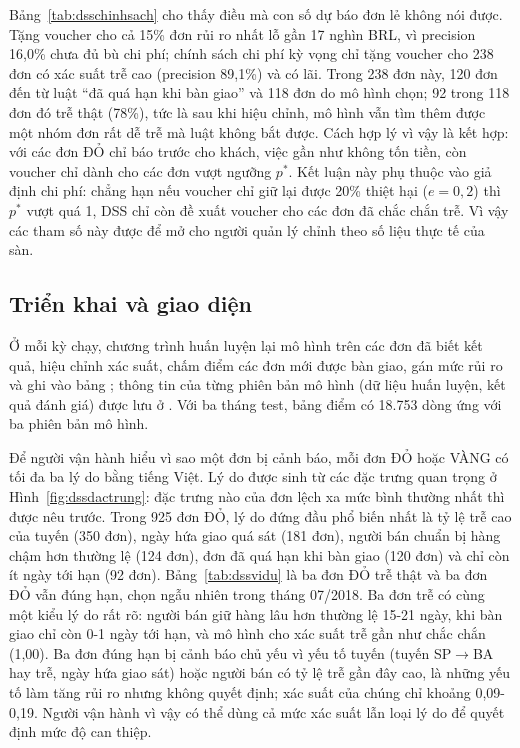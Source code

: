 Bảng~\ref{tab:dsschinhsach} cho thấy điều mà con số dự báo đơn lẻ không nói được. Tặng voucher cho cả 15\% đơn rủi ro nhất lỗ gần 17 nghìn BRL, vì precision 16,0\% chưa đủ bù chi phí; chính sách chi phí kỳ vọng chỉ tặng voucher cho 238 đơn có xác suất trễ cao (precision 89,1\%) và có lãi. Trong 238 đơn này, 120 đơn đến từ luật ``đã quá hạn khi bàn giao'' và 118 đơn do mô hình chọn; 92 trong 118 đơn đó trễ thật (78\%), tức là sau khi hiệu chỉnh, mô hình vẫn tìm thêm được một nhóm đơn rất dễ trễ mà luật không bắt được. Cách hợp lý vì vậy là kết hợp: với các đơn ĐỎ chỉ báo trước cho khách, việc gần như không tốn tiền, còn voucher chỉ dành cho các đơn vượt ngưỡng $p^{*}$. Kết luận này phụ thuộc vào giả định chi phí: chẳng hạn nếu voucher chỉ giữ lại được 20\% thiệt hại ($e = 0{,}2$) thì $p^{*}$ vượt quá 1, DSS chỉ còn đề xuất voucher cho các đơn đã chắc chắn trễ. Vì vậy các tham số này được để mở cho người quản lý chỉnh theo số liệu thực tế của sàn.

\subsection{Triển khai và giao diện}\label{sec:dsstrienkhai}

Ở mỗi kỳ chạy, chương trình  huấn luyện lại mô hình trên các đơn đã biết kết quả, hiệu chỉnh xác suất, chấm điểm các đơn mới được bàn giao, gán mức rủi ro và ghi vào bảng ; thông tin của từng phiên bản mô hình (dữ liệu huấn luyện, kết quả đánh giá) được lưu ở . Với ba tháng test, bảng điểm có 18.753 dòng ứng với ba phiên bản mô hình.

Để người vận hành hiểu vì sao một đơn bị cảnh báo, mỗi đơn ĐỎ hoặc VÀNG có tối đa ba lý do bằng tiếng Việt. Lý do được sinh từ các đặc trưng quan trọng ở Hình~\ref{fig:dssdactrung}: đặc trưng nào của đơn lệch xa mức bình thường nhất thì được nêu trước. Trong 925 đơn ĐỎ, lý do đứng đầu phổ biến nhất là tỷ lệ trễ cao của tuyến (350 đơn), ngày hứa giao quá sát (181 đơn), người bán chuẩn bị hàng chậm hơn thường lệ (124 đơn), đơn đã quá hạn khi bàn giao (120 đơn) và chỉ còn ít ngày tới hạn (92 đơn). Bảng~\ref{tab:dssvidu} là ba đơn ĐỎ trễ thật và ba đơn ĐỎ vẫn đúng hạn, chọn ngẫu nhiên trong tháng 07/2018. Ba đơn trễ có cùng một kiểu lý do rất rõ: người bán giữ hàng lâu hơn thường lệ 15-21 ngày, khi bàn giao chỉ còn 0-1 ngày tới hạn, và mô hình cho xác suất trễ gần như chắc chắn (1,00). Ba đơn đúng hạn bị cảnh báo chủ yếu vì yếu tố tuyến (tuyến SP$\rightarrow$BA hay trễ, ngày hứa giao sát) hoặc người bán có tỷ lệ trễ gần đây cao, là những yếu tố làm tăng rủi ro nhưng không quyết định; xác suất của chúng chỉ khoảng 0,09-0,19. Người vận hành vì vậy có thể dùng cả mức xác suất lẫn loại lý do để quyết định mức độ can thiệp.

